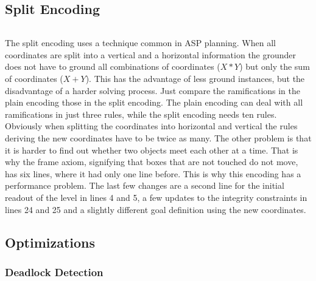 \documentclass{report}
\begin{document}
\subsection{Split Encoding}

\begin{lstlisting}[caption={Split Encoding},label=list:SplitEnc]
\end{lstlisting}
The split encoding uses a technique common in ASP planning. When all coordinates are split into a vertical and a horizontal information the grounder does not have to ground all combinations of coordinates ($X * Y$) but only the sum of coordinates ($X + Y$). This has the advantage of less ground instances, but the disadvantage of a harder solving process. Just compare the ramifications in the plain encoding those in the split encoding. The plain encoding can deal with all ramifications in just three rules, while the split encoding needs ten rules. Obviously when splitting the coordinates into horizontal and vertical the rules deriving the new coordinates have to be twice as many. The other problem is that it is harder to find out whether two objects meet each other at a time. That is why the frame axiom, signifying that boxes that are not touched do not move, has six lines, where it had only one line before. This is why this encoding has a performance problem.
The last few changes are a second line for the initial readout of the level in lines 4 and 5, a few updates to the integrity constraints in lines 24 and 25 and a slightly different goal definition using the new coordinates.

\subsection{Optimizations}

\subsubsection{Deadlock Detection}


\begin{lstlisting}[caption={Forbidden Fields},label=list:Forbidden]
\end{lstlisting}
\end{document}
